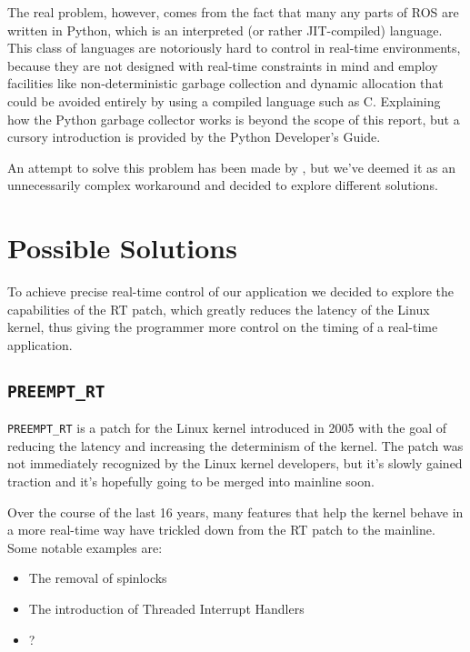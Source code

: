 \documentclass[a4paper,12pt]{report}
\begin{document}
The real problem, however, comes from the fact that many any parts of ROS are written in Python, which is an interpreted (or rather JIT-compiled) language. This class of languages are notoriously hard to control in real-time environments, because they are not designed with real-time constraints in mind and employ facilities like non-deterministic garbage collection and dynamic allocation that could be avoided entirely by using a compiled language such as C. Explaining how the Python garbage collector works is beyond the scope of this report, but a cursory introduction is provided by the Python Developer's Guide\cite{python-devguide-gc}.

An attempt to solve this problem has been made by , but we've deemed it as an unnecessarily complex workaround and decided to explore different solutions.

\section{Possible Solutions}

To achieve precise real-time control of our application we decided to explore the capabilities of the RT patch, which greatly reduces the latency of the Linux kernel, thus giving the programmer more control on the timing of a real-time application.

\subsection{\texttt{PREEMPT\_RT}}

\texttt{PREEMPT\_RT} is a patch for the Linux kernel introduced in 2005 with the goal of reducing the latency and increasing the determinism of the kernel. The patch was not immediately recognized by the Linux kernel developers, but it's slowly gained traction and it's hopefully going to be merged into mainline soon\cite{lwn-rt-future}.

Over the course of the last 16 years, many features that help the kernel behave in a more real-time way have trickled down from the RT patch to the mainline. Some notable examples are:

\begin{itemize}
    \item The removal of spinlocks
    \item The introduction of Threaded Interrupt Handlers
    \item ?
\end{itemize}
\end{document}

